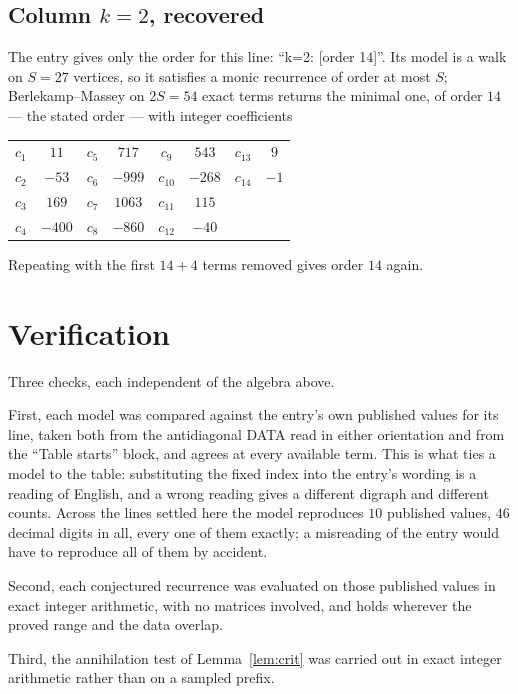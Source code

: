 \documentclass[11pt,a4paper]{article}
\theoremstyle{plain}
\theoremstyle{definition}
\begin{document}
\subsection*{Column $k=2$, recovered}
The entry gives only the order for this line: ``k=2: [order 14]''. Its model is a walk on
$S=27$ vertices, so it satisfies a monic recurrence of order at most $S$;
Berlekamp--Massey on $2S=54$ exact terms returns the minimal one, of order
$14$ --- the stated order --- with integer coefficients
\begin{center}\small\begin{tabular}{cccccccc}
$c_{1}$ & $11$ & $c_{5}$ & $717$ & $c_{9}$ & $543$ & $c_{13}$ & $9$ \\
$c_{2}$ & $-53$ & $c_{6}$ & $-999$ & $c_{10}$ & $-268$ & $c_{14}$ & $-1$ \\
$c_{3}$ & $169$ & $c_{7}$ & $1063$ & $c_{11}$ & $115$ &  &  \\
$c_{4}$ & $-400$ & $c_{8}$ & $-860$ & $c_{12}$ & $-40$ &  &  \\
\end{tabular}\end{center}
Repeating with the first $14+4$ terms removed gives order $14$ again.

\section{Verification}

Three checks, each independent of the algebra above.

First, each model was compared against the entry's own published values for its line, taken
both from the antidiagonal DATA read in either orientation and from the ``Table starts''
block, and agrees at every available term. This is what ties a model to the table:
substituting the fixed index into the entry's wording is a reading of English, and a wrong
reading gives a different digraph and different counts. Across the lines settled here the
model reproduces $10$ published values, $46$ decimal digits in all, every one of
them exactly; a misreading of the entry would have to reproduce all of them by accident.

Second, each conjectured recurrence was evaluated on those published values in exact
integer arithmetic, with no matrices involved, and holds wherever the proved range and the
data overlap.

Third, the annihilation test of Lemma~\ref{lem:crit} was carried out in exact integer
arithmetic rather than on a sampled prefix.
\end{document}
